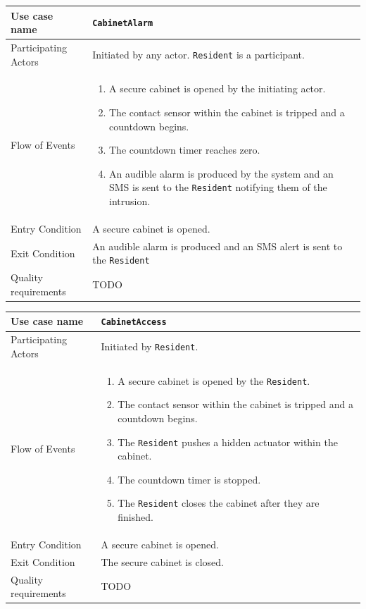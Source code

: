 \documentclass{report}
\begin{document}
\begin{tabular}{| l | p{7cm} |}
\hline
Use case name & \texttt{CabinetAlarm} \\ \hline
Participating Actors & Initiated by any actor. \texttt{Resident} is a participant. \\ \hline
Flow of Events & 

\begin{enumerate}
 \item A secure cabinet is opened by the initiating actor.
 \item The contact sensor within the cabinet is tripped and a countdown begins.
 \item The countdown timer reaches zero.
 \item An audible alarm is produced by the system and an SMS is sent to the
       \texttt{Resident} notifying them of the intrusion.
\end{enumerate}

\\ \hline

Entry Condition & A secure cabinet is opened. \\ \hline
Exit Condition & An audible alarm is produced and an SMS alert is sent to
                 the \texttt{Resident} \\ \hline
Quality requirements & TODO \\ \hline

\hline
\end{tabular}

\begin{tabular}{| l | p{7cm} |}
\hline
Use case name & \texttt{CabinetAccess} \\ \hline
Participating Actors & Initiated by \texttt{Resident}. \\ \hline
Flow of Events & 

\begin{enumerate}
 \item A secure cabinet is opened by the \texttt{Resident}.
 \item The contact sensor within the cabinet is tripped and a countdown begins.
 \item The \texttt{Resident} pushes a hidden actuator within the cabinet.
 \item The countdown timer is stopped.
 \item The \texttt{Resident} closes the cabinet after they are finished.
\end{enumerate}

\\ \hline

Entry Condition & A secure cabinet is opened. \\ \hline
Exit Condition & The secure cabinet is closed. \\ \hline
Quality requirements & TODO \\ \hline

\hline
\end{tabular}
\end{document}

